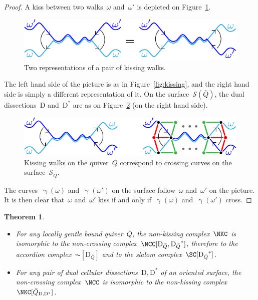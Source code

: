 \documentclass{amsart}
\newtheorem{theorem}{Theorem}[section]
\theoremstyle{definition}
\newcommand{\fref}[1]{Figure~\ref{#1}} %
\newcommand{\surface}{\mathcal{S}} %
\newcommand{\dual}{^*} %
\newcommand{\dissection}{\mathrm{D}} %
\newcommand{\curveof}{\operatorname{\gamma}} %
\begin{document}
\begin{proof}
A kiss between two walks~$\omega$ and~$\omega'$ is depicted on \fref{fig:kissings}.

\begin{figure}[h]
	\capstart
	\centerline{\includegraphics[scale=1]{kissings}}
	\caption{Two representations of a pair of kissing walks.}
	\label{fig:kissings}
\end{figure}
The left hand side of the picture is as in \fref{fig:kissing}, and the right hand side is simply a different representation of it.
On the surface~$\surface(\bar Q)$, the dual dissections~$\dissection$ and~$\dissection\dual$ are as on \fref{fig:kissingVSCrossing} (on the right hand side).

\begin{figure}[h]
	\capstart
	\centerline{\includegraphics[scale=1]{kissingVSCrossing}}
	\caption{Kissing walks on the quiver~$\bar Q$ correspond to crossing curves on the surface~$\surface_{\bar Q}$.}
	\label{fig:kissingVSCrossing}
\end{figure}

The curves~$\curveof(\omega)$ and~$\curveof(\omega')$ on the surface follow~$\omega$ and~$\omega'$ on the picture.
It is then clear that~$\omega$ and~$\omega'$ kiss if and only if~$\curveof(\omega)$ and~$\curveof(\omega')$ cross. 

\end{proof}

\begin{theorem}
\label{thm:complexesCoincide}
$\phantom{x}$
\begin{itemize}
\item For any locally gentle bound quiver~$\bar Q$, the non-kissing complex~$\NKC$ is isomorphic to the non-crossing complex~$\NCC[\dissection_{\bar Q}, {\dissection_{\bar Q}}\dual]$, therefore to the accordion complex~$\AC[\dissection_{\bar Q}]$ and to the slalom complex~$\SC[{\dissection_{\bar Q}}\dual]$.
\item For any pair of dual cellular dissections~$\dissection, \dissection\dual$ of an oriented surface, the non-crossing complex~$\NCC$ is isomorphic to the non-kissing complex~$\NKC[\bar Q_{\dissection, \dissection\dual}]$.
\end{itemize}
\end{theorem}
\end{document}
